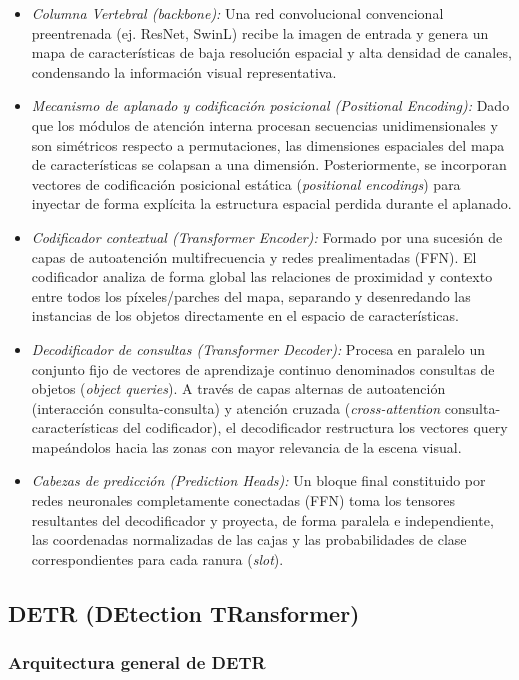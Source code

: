 \begin{itemize}
    \item \textit{Columna Vertebral (backbone):} Una red convolucional convencional preentrenada (ej. ResNet, SwinL) recibe la imagen de entrada y genera un mapa de características de baja resolución espacial y alta densidad de canales, condensando la información visual representativa.
    \item \textit{Mecanismo de aplanado y codificación posicional (Positional Encoding):} Dado que los módulos de atención interna procesan secuencias unidimensionales y son simétricos respecto a permutaciones, las dimensiones espaciales del mapa de características se colapsan a una dimensión. Posteriormente, se incorporan vectores de codificación posicional estática (\textit{positional encodings}) para inyectar de forma explícita la estructura espacial perdida durante el aplanado.
    \item \textit{Codificador contextual (Transformer Encoder):} Formado por una sucesión de capas de autoatención multifrecuencia y redes prealimentadas (FFN). El codificador analiza de forma global las relaciones de proximidad y contexto entre todos los píxeles/parches del mapa, separando y desenredando las instancias de los objetos directamente en el espacio de características.
    \item \textit{Decodificador de consultas (Transformer Decoder):} Procesa en paralelo un conjunto fijo de vectores de aprendizaje continuo denominados consultas de objetos (\textit{object queries}). A través de capas alternas de autoatención (interacción consulta-consulta) y atención cruzada (\textit{cross-attention} consulta-características del codificador), el decodificador restructura los vectores query mapeándolos hacia las zonas con mayor relevancia de la escena visual.
    \item \textit{Cabezas de predicción (Prediction Heads):} Un bloque final constituido por redes neuronales completamente conectadas (FFN) toma los tensores resultantes del decodificador y proyecta, de forma paralela e independiente, las coordenadas normalizadas de las cajas y las probabilidades de clase correspondientes para cada ranura (\textit{slot}).
\end{itemize}

\subsection{DETR (DEtection TRansformer)}

\subsubsection{Arquitectura general de DETR}

